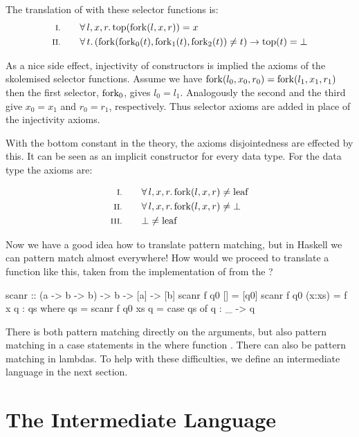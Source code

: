 \noindent
The translation of  with these selector functions is:
\begin{align*}
\rom{1} \qquad & \faaa{l}{x}{r} \fn{top}(\fn{fork}(l,x,r)) \eq x \\
\rom{2} \qquad & \fa{t}         (\fn{fork}(\fn{fork_0}(t),\fn{fork_1}(t),\fn{fork_2}(t)) \neq t) \rightarrow \fn{top}(t) \eq \bot
\end{align*}

\noindent
As a nice side effect, injectivity of constructors is implied the
axioms of the skolemised selector functions. Assume we have
$\mathrm{fork}(l_0,x_0,r_0)=\mathrm{fork}(l_1,x_1,r_1)$ then the first
selector, $\mathrm{fork_0}$, gives $l_0=l_1$. Analogously the second and
the third give $x_0=x_1$ and $r_0=r_1$, respectively. Thus selector
axioms are added in place of the injectivity axioms.

With the bottom constant in the theory, the axioms disjointedness are
effected by this. It can be seen as an implicit constructor for every
data type. For the  data type the axioms are:

\begin{align*}
\rom{1} \qquad & \faaa{l}{x}{r} \fn{fork}(l,x,r) \neq \fn{leaf} \\
\rom{2} \qquad & \faaa{l}{x}{r} \fn{fork}(l,x,r) \neq \bot      \\
\rom{3} \qquad & \bot \neq \fn{leaf}
\end{align*}

Now we have a good idea how to translate pattern matching, but
in Haskell we can pattern match almost everywhere! How would we
proceed to translate a function like this, taken from the
implementation of  from the ?

\begin{code}
scanr             :: (a -> b -> b) -> b -> [a] -> [b]
scanr f q0 []     =  [q0]
scanr f q0 (x:xs) =  f x q : qs
                     where qs = scanr f q0 xs
                           q = case qs of
                                 q : _ -> q
\end{code}

\noindent
There is both pattern matching directly on the arguments, but also
pattern matching in a case statements in the where function
. There can also be pattern matching in lambdas. To help with
these difficulties, we define an intermediate language in the next
section.

\section{The Intermediate Language}

